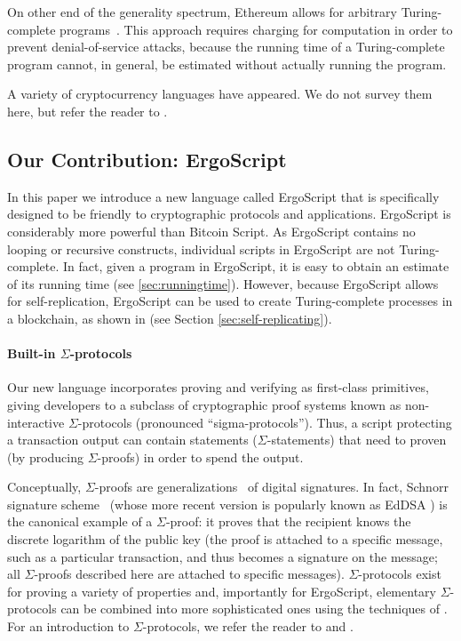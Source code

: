 \documentclass[11pt]{article}
\newcommand{\authnote}[2]{\marginpar{\parbox{\marginparwidth}{\tiny %
  \textsf{#1 {\textcolor{blue}{notes: #2}}}}}%
  \textcolor{blue}{\textbf{\dag}}}
\newcommand{\authnote}[2]{
  \textsf{#1 \textcolor{blue}{: #2}}}
\newcommand{\authnote}[2]{}
\newcommand{\lnote}[1]{{\authnote{\textcolor{orange}{Leo notes}}{#1}}}
\newcommand{\knote}[1]{{\authnote{\textcolor{green}{kushti notes}}{#1}}}
\newcommand{\langname}{ErgoScript\xspace}
\begin{document}
On other end of the generality spectrum, Ethereum allows for arbitrary Turing-complete programs~\cite{wood2014ethereum}. This approach requires charging for computation \knote{it is also required to have gas limit per block, otherwise DoS is possible anyway if there are enough resources to pay for it, also, a miner can do DoS for free} in order to prevent denial-of-service attacks, because the running time of a Turing-complete program cannot, in general, be estimated without actually running the program.

A variety of cryptocurrency languages have appeared. We do not survey them here, but refer the reader to \cite[p. 11]{Scilla}. \lnote{if time, can talk about Simplicity, Plutus, TypeCoin, Rholang, Scilla \dots} \knote{As detailed comparison would be time-consuming, lets just provide links to all the competitors. }

\subsection{Our Contribution: \langname}
In this paper we introduce a new language called \langname that is specifically designed to be friendly to cryptographic protocols and applications. \langname is considerably more powerful than Bitcoin Script. As \langname contains no looping or recursive constructs, individual scripts in \langname are not Turing-complete.  In fact, given a program in \langname, it is easy to obtain an estimate of its running time (see \ref{sec:runningtime}). However, because \langname allows for self-replication, \langname can be used to create Turing-complete processes in a blockchain, as shown in \cite{CKM18} (see  Section \ref{sec:self-replicating}).


\paragraph{Built-in $\Sigma$-protocols}
Our new language incorporates proving and verifying as first-class primitives, giving developers to a subclass of cryptographic proof systems known as non-interactive $\Sigma$-protocols (pronounced ``sigma-protocols'').   Thus, a script protecting a transaction output can contain statements ($\Sigma$-statements) that need to proven (by producing $\Sigma$-proofs) in order to spend the output.

Conceptually, $\Sigma$-proofs \cite{Cra96} are generalizations~\cite{CL06} of digital signatures.
In fact, Schnorr signature scheme~\cite{Sch91} (whose more recent version is popularly known as EdDSA \cite{BDLSY12,rfc8032}) is the canonical example of a $\Sigma$-proof: it proves that the recipient knows the discrete logarithm of the public key (the proof is attached to a specific message, such as a particular transaction, and thus becomes a signature on the message; all $\Sigma$-proofs described here are attached to specific messages). $\Sigma$-protocols exist for proving a variety of properties and, importantly for \langname, elementary $\Sigma$-protocols can be combined into more sophisticated ones using the techniques of \cite{CDS94}. For an introduction to $\Sigma$-protocols, we refer the reader to \cite{Dam10} and \cite[Chapter 6]{HL10}.
\end{document}
